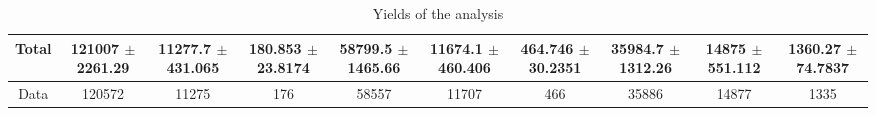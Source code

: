 \documentclass[10pt]{article}
\begin{document}
\begin{table}[htbp]
\begin{center}
\begin{tabular}{|c|c|c|c|c|c|c|c|c|c|}
\hline 
  Total  & \num[round-mode=figures,round-precision=3]{121007} $\pm$ \num[round-mode=figures,round-precision=3]{2261.29} & \num[round-mode=figures,round-precision=3]{11277.7} $\pm$ \num[round-mode=figures,round-precision=3]{431.065} & \num[round-mode=figures,round-precision=3]{180.853} $\pm$ \num[round-mode=figures,round-precision=3]{23.8174} & \num[round-mode=figures,round-precision=3]{58799.5} $\pm$ \num[round-mode=figures,round-precision=3]{1465.66} & \num[round-mode=figures,round-precision=3]{11674.1} $\pm$ \num[round-mode=figures,round-precision=3]{460.406} & \num[round-mode=figures,round-precision=3]{464.746} $\pm$ \num[round-mode=figures,round-precision=3]{30.2351} & \num[round-mode=figures,round-precision=3]{35984.7} $\pm$ \num[round-mode=figures,round-precision=3]{1312.26} & \num[round-mode=figures,round-precision=3]{14875} $\pm$ \num[round-mode=figures,round-precision=3]{551.112} & \num[round-mode=figures,round-precision=3]{1360.27} $\pm$ \num[round-mode=figures,round-precision=3]{74.7837} \\ 
\hline 
  Data   & 120572 & 11275 & 176 & 58557 & 11707 & 466 & 35886 & 14877 & 1335 \\ 
\hline 
\end{tabular} 
\caption{Yields of the analysis} 
\end{center} 
\end{table} 
\end{document}
